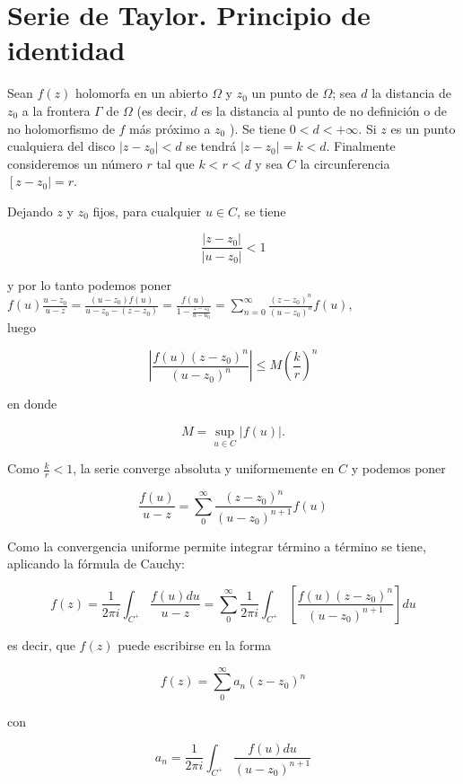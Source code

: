 \documentclass[10pt]{article}
\theoremstyle{plain}
\theoremstyle{definition}
\theoremstyle{remark}
\begin{document}
\section{Serie de Taylor. Principio de identidad}
Sean $f(z)$ holomorfa en un abierto $\Omega$ y $z_{0}$ un punto de $\Omega$; sea $d$ la distancia de $z_{0}$ a la frontera $\Gamma$ de $\Omega$ (es decir, $d$ es la distancia al punto de no definición o de no holomorfismo de $f$ más próximo a $z_{0}$ ). Se tiene $0<d<+\infty$. Si $z$ es un punto cualquiera del disco $\left|z-z_{0}\right|<d$ se tendrá $\left|z-z_{0}\right|=k<d$. Finalmente consideremos un número $r$ tal que $k<r<d$ y sea $C$ la circunferencia $\left[z-z_{0} \mid=r\right.$.

Dejando $z$ y $z_{0}$ fijos, para cualquier $u \in C$, se tiene

$$
\frac{\left|z-z_{0}\right|}{\left|u-z_{0}\right|}<1
$$

y por lo tanto podemos poner\\
$f(u) \frac{u-z_{0}}{u-z}=\frac{\left(u-z_{0}\right) f(u)}{u-z_{0}-\left(z-z_{0}\right)}=\frac{f(u)}{1-\frac{z-z_{0}}{u-u_{0}}}=\sum_{n=0}^{\infty} \frac{\left(z-z_{0}\right)^{n}}{\left(u-z_{0}\right)^{n}} f(u)$,\\
luego

$$
\left|\frac{f(u)\left(z-z_{0}\right)^{n}}{\left(u-z_{0}\right)^{n}}\right| \leqslant M\left(\frac{k}{r}\right)^{n}
$$

en donde

$$
M=\sup _{u \in C}|f(u)| .
$$

Como $\frac{k}{r}<1$, la serie converge absoluta y uniformemente en $C$ y podemos poner

$$
\frac{f(u)}{u-z}=\sum_{0}^{\infty} \frac{\left(z-z_{0}\right)^{n}}{\left(u-z_{0}\right)^{n+1}} f(u)
$$

Como la convergencia uniforme permite integrar término a término se tiene, aplicando la fórmula de Cauchy:

$$
f(z)=\frac{1}{2 \pi i} \int_{C^{+}} \frac{f(u) d u}{u-z}=\sum_{0}^{\infty} \frac{1}{2 \pi i} \int_{C^{+}}\left[\frac{f(u)\left(z-z_{0}\right)^{n}}{\left(u-z_{0}\right)^{n+1}}\right] d u
$$

es decir, que $f(z)$ puede escribirse en la forma

$$
f(z)=\sum_{0}^{\infty} a_{n}\left(z-z_{0}\right)^{n}
$$

con


\begin{equation*}
a_{n}=\frac{1}{2 \pi i} \int_{C^{+}} \frac{f(u) d u}{\left(u-z_{0}\right)^{n+1}} \tag{11-1}
\end{equation*}
\end{document}
